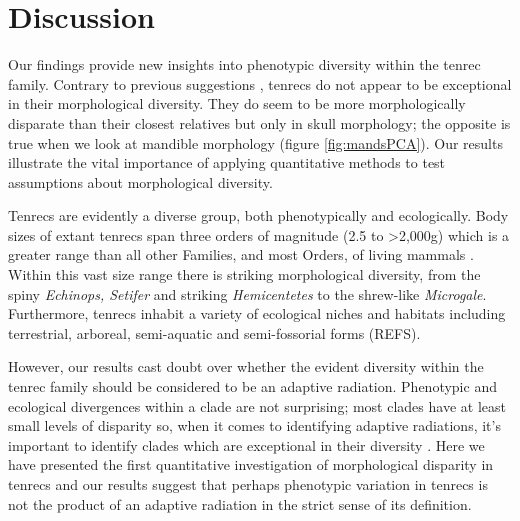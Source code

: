 \documentclass[12pt,a4paper]{article}
\begin{document}
\section{Discussion} %


Our findings provide new insights into phenotypic diversity within the tenrec family. Contrary to previous suggestions \citep[e.g.][]{Eisenberg1969, Olson2013}, tenrecs do not appear to be exceptional in their morphological diversity. They do seem to be more morphologically disparate than their closest relatives but only in skull morphology; the opposite is true when we look at mandible morphology (figure \ref{fig:mandsPCA}). Our results illustrate the vital importance of applying quantitative methods to test assumptions about morphological diversity. 


Tenrecs are evidently a diverse group, both phenotypically and ecologically. Body sizes of extant tenrecs span three orders of magnitude (2.5 to \textgreater 2,000g) which is a greater range than all other Families, and most Orders, of living mammals \citep{Olson2003}. Within this vast size range there is striking morphological diversity, from the spiny \textit{Echinops, Setifer} and striking \textit{Hemicentetes} to the shrew-like  \textit{Microgale}. Furthermore, tenrecs inhabit a variety of ecological niches and habitats including terrestrial, arboreal, semi-aquatic and semi-fossorial forms (REFS).

However, our results cast doubt over whether the evident diversity within the tenrec family should be considered to be an adaptive radiation. Phenotypic and ecological divergences within a clade are not surprising; most clades have at least small levels of disparity so, when it comes to identifying adaptive radiations, it's important to identify clades which are exceptional in their diversity \citep{Losos2010a}. Here we have presented the first quantitative investigation of morphological disparity in tenrecs and our results suggest that perhaps phenotypic variation in tenrecs is not the product of an adaptive radiation in the strict sense of its definition.
\end{document}
